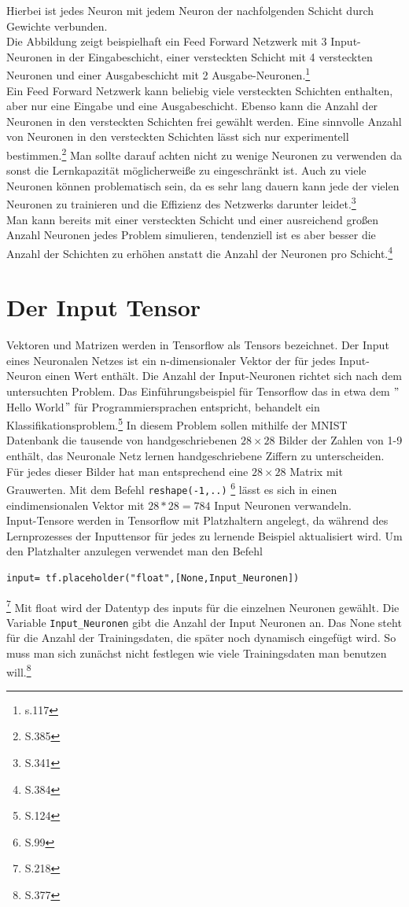 Hierbei ist jedes Neuron mit jedem Neuron der nachfolgenden Schicht durch Gewichte verbunden.\\
Die Abbildung zeigt beispielhaft ein Feed Forward Netzwerk mit 3 Input-Neuronen in der Eingabeschicht, einer versteckten Schicht mit 4 versteckten Neuronen und einer Ausgabeschicht mit 2 Ausgabe-Neuronen.\footnote{\cite{Bishop1995}s.117}\\
Ein Feed Forward Netzwerk kann beliebig viele versteckten Schichten enthalten, aber nur eine Eingabe und eine Ausgabeschicht. Ebenso kann die Anzahl der Neuronen in den versteckten Schichten frei gewählt werden. Eine sinnvolle Anzahl von Neuronen in den versteckten Schichten lässt sich nur experimentell bestimmen.\footnote{\cite{handson} S.385} Man sollte darauf achten nicht zu wenige Neuronen zu verwenden da sonst die Lernkapazität möglicherweiße zu eingeschränkt ist. Auch zu viele Neuronen können problematisch sein, da es sehr lang dauern kann jede der vielen Neuronen zu trainieren und die Effizienz des Netzwerks darunter leidet.\footnote{\cite{Rashid} S.341}\\ Man kann bereits mit einer versteckten Schicht und einer ausreichend großen Anzahl Neuronen jedes Problem simulieren, tendenziell ist es aber besser die Anzahl der Schichten zu erhöhen anstatt die Anzahl der Neuronen pro Schicht.\footnote{\cite{handson} S.384}
\section{Der Input Tensor}
Vektoren und Matrizen werden in Tensorflow als Tensors bezeichnet. Der Input eines Neuronalen Netzes ist ein n-dimensionaler Vektor der für jedes Input-Neuron einen Wert enthält. Die Anzahl der Input-Neuronen richtet sich nach dem untersuchten Problem. Das Einführungsbeispiel für Tensorflow das in etwa dem $"$Hello World$"$ für Programmiersprachen entspricht, behandelt ein Klassifikationsproblem.\footnote{\cite{handson} S.124} In diesem Problem sollen mithilfe der MNIST Datenbank die tausende von handgeschriebenen $28 \times 28$ Bilder der Zahlen von 1-9 enthält, das Neuronale Netz lernen handgeschriebene Ziffern zu unterscheiden. Für jedes dieser Bilder hat man entsprechend eine $28 \times 28$ Matrix mit Grauwerten. Mit dem Befehl \lstinline$reshape(-1,..)$ \footnote{\cite{handson} S.99} lässt es sich in einen eindimensionalen Vektor mit  $28*28=784$ Input Neuronen verwandeln.\\
Input-Tensore werden in Tensorflow mit Platzhaltern angelegt, da während des Lernprozesses der Inputtensor für jedes zu lernende Beispiel aktualisiert wird. Um den Platzhalter anzulegen verwendet man den Befehl\begin{lstlisting}
input= tf.placeholder("float",[None,Input_Neuronen])
\end{lstlisting}\footnote{\cite{cookbook} S.218} 
Mit float wird der Datentyp des inputs für die einzelnen Neuronen gewählt. Die Variable \lstinline$Input_Neuronen$ gibt die Anzahl der Input Neuronen an. Das None steht für die Anzahl der Trainingsdaten, die später noch dynamisch eingefügt wird. So muss man sich zunächst nicht festlegen wie viele Trainingsdaten man benutzen will.\footnote{\cite{handson} S.377}

